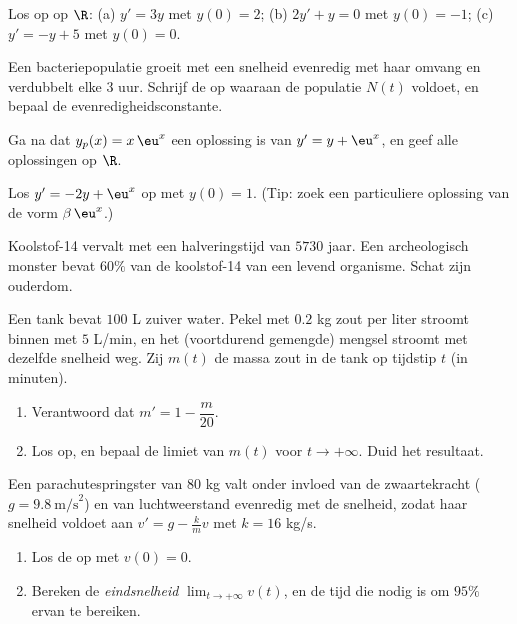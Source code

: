 \begin{exercise}[$\star$]\label{exo:g12:diffeq:1}
Los op op $\R$:
(a) $y' = 3y$ met $y(0) = 2$;\quad
(b) $2y' + y = 0$ met $y(0) = -1$;\quad
(c) $y' = -y + 5$ met $y(0) = 0$.
\end{exercise}

\begin{exercise}[$\star$]\label{exo:g12:diffeq:2}
Een bacteriepopulatie groeit met een snelheid evenredig met haar omvang en
verdubbelt elke $3$ uur. Schrijf de  op waaraan de
populatie $N(t)$ voldoet, en bepaal de evenredigheidsconstante.
\end{exercise}

\begin{exercise}[$\star$]\label{exo:g12:diffeq:3}
Ga na dat $y_p(x) = x\,\eu^{x}$ een oplossing is van $y' = y + \eu^x$, en
geef alle oplossingen op $\R$.
\end{exercise}

\begin{exercise}[$\star\star$]\label{exo:g12:diffeq:4}
Los $y' = -2y + \eu^{x}$ op met $y(0) = 1$. (Tip: zoek een particuliere
oplossing van de vorm $\beta\,\eu^{x}$.)
\end{exercise}

\begin{exercise}[$\star\star$]\label{exo:g12:diffeq:5}
Koolstof-14 vervalt met een halveringstijd van $5730$ jaar. Een
archeologisch monster bevat $60\%$ van de koolstof-14 van een levend
organisme. Schat zijn ouderdom.
\end{exercise}

\begin{exercise}[$\star\star$]\label{exo:g12:diffeq:6}
Een tank bevat $100$ L zuiver water. Pekel met $0.2$ kg zout per liter
stroomt binnen met $5$ L/min, en het (voortdurend gemengde) mengsel stroomt
met dezelfde snelheid weg. Zij $m(t)$ de massa zout in de tank op tijdstip
$t$ (in minuten).
\begin{enumerate}
  \item Verantwoord dat $m' = 1 - \dfrac{m}{20}$.
  \item Los op, en bepaal de limiet van $m(t)$ voor $t \to +\infty$. Duid het
        resultaat.
\end{enumerate}
\end{exercise}

\begin{exercise}[$\star\star$]\label{exo:g12:diffeq:7}
Een parachutespringster van $80$ kg valt onder invloed van de zwaartekracht
($g = 9.8\ \text{m/s}^2$) en van luchtweerstand evenredig met de snelheid,
zodat haar snelheid voldoet aan $v' = g - \frac{k}{m}v$ met $k = 16$ kg/s.
\begin{enumerate}
  \item Los de  op met $v(0) = 0$.
  \item Bereken de \emph{eindsnelheid} $\lim_{t\to+\infty} v(t)$, en de tijd
        die nodig is om $95\%$ ervan te bereiken.
\end{enumerate}
\end{exercise}


